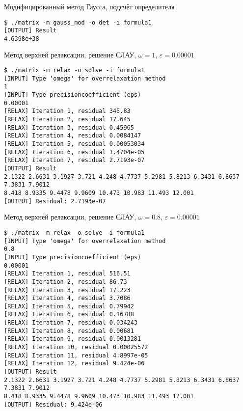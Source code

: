 \documentclass[a4paper,11pt]{report}
\begin{document}
\begin{bash}
 \caption{Модифицированный метод Гаусса, подсчёт определителя}
 \begin{verbatim}
$ ./matrix -m gauss_mod -o det -i formula1 
[OUTPUT] Result
4.6398e+38
 \end{verbatim}
\end{bash}

\begin{bash}
\caption{Метод верхней релаксации, решение СЛАУ, $\omega = 1$, $\varepsilon = 0.00001$}
\begin{verbatim}
$ ./matrix -m relax -o solve -i formula1 
[INPUT] Type 'omega' for overrelaxation method
1
[INPUT] Type precisioncoefficient (eps)
0.00001
[RELAX] Iteration 1, residual 345.83
[RELAX] Iteration 2, residual 17.645
[RELAX] Iteration 3, residual 0.45965
[RELAX] Iteration 4, residual 0.0084147
[RELAX] Iteration 5, residual 0.00053034
[RELAX] Iteration 6, residual 1.4704e-05
[RELAX] Iteration 7, residual 2.7193e-07
[OUTPUT] Result
2.1322 2.6631 3.1927 3.721 4.248 4.7737 5.2981 5.8213 6.3431 6.8637 7.3831 7.9012
8.418 8.9335 9.4478 9.9609 10.473 10.983 11.493 12.001 
[OUTPUT] Residual: 2.7193e-07
\end{verbatim}
\end{bash}

\begin{bash}
\caption{Метод верхней релаксации, решение СЛАУ, $\omega = 0.8$, $\varepsilon = 0.00001$}
\begin{verbatim}
$ ./matrix -m relax -o solve -i formula1 
[INPUT] Type 'omega' for overrelaxation method
0.8
[INPUT] Type precisioncoefficient (eps)
0.00001
[RELAX] Iteration 1, residual 516.51
[RELAX] Iteration 2, residual 86.73
[RELAX] Iteration 3, residual 17.223
[RELAX] Iteration 4, residual 3.7086
[RELAX] Iteration 5, residual 0.79942
[RELAX] Iteration 6, residual 0.16788
[RELAX] Iteration 7, residual 0.034243
[RELAX] Iteration 8, residual 0.00681
[RELAX] Iteration 9, residual 0.0013281
[RELAX] Iteration 10, residual 0.00025572
[RELAX] Iteration 11, residual 4.8997e-05
[RELAX] Iteration 12, residual 9.424e-06
[OUTPUT] Result
2.1322 2.6631 3.1927 3.721 4.248 4.7737 5.2981 5.8213 6.3431 6.8637 7.3831 7.9012
8.418 8.9335 9.4478 9.9609 10.473 10.983 11.493 12.001 
[OUTPUT] Residual: 9.424e-06
\end{verbatim}
\end{bash}
\end{document}
